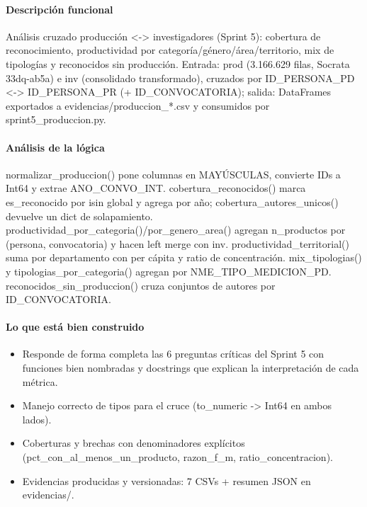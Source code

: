 \paragraph{Descripción funcional}
Análisis cruzado producción <-> investigadores (Sprint 5): cobertura de reconocimiento, productividad por categoría/género/área/territorio, mix de tipologías y reconocidos sin producción. Entrada: prod (3.166.629 filas, Socrata 33dq-ab5a) e inv (consolidado transformado), cruzados por ID\_PERSONA\_PD <-> ID\_PERSONA\_PR (+ ID\_CONVOCATORIA); salida: DataFrames exportados a evidencias/produccion\_*.csv y consumidos por sprint5\_produccion.py.

\paragraph{Análisis de la lógica}
normalizar\_produccion() pone columnas en MAYÚSCULAS, convierte IDs a Int64 y extrae ANO\_CONVO\_INT. cobertura\_reconocidos() marca es\_reconocido por isin global y agrega por año; cobertura\_autores\_unicos() devuelve un dict de solapamiento. productividad\_por\_categoria()/por\_genero\_area() agregan n\_productos por (persona, convocatoria) y hacen left merge con inv. productividad\_territorial() suma por departamento con per cápita y ratio de concentración. mix\_tipologias() y tipologias\_por\_categoria() agregan por NME\_TIPO\_MEDICION\_PD. reconocidos\_sin\_produccion() cruza conjuntos de autores por ID\_CONVOCATORIA.

\paragraph{Lo que está bien construido}
\begin{itemize}
  \item Responde de forma completa las 6 preguntas críticas del Sprint 5 con funciones bien nombradas y docstrings que explican la interpretación de cada métrica.
  \item Manejo correcto de tipos para el cruce (to\_numeric -> Int64 en ambos lados).
  \item Coberturas y brechas con denominadores explícitos (pct\_con\_al\_menos\_un\_producto, razon\_f\_m, ratio\_concentracion).
  \item Evidencias producidas y versionadas: 7 CSVs + resumen JSON en evidencias/.
\end{itemize}

